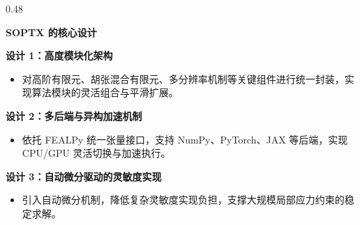 \documentclass[notheorems]{beamer}
\begin{document}
\begin{frame}
\begin{columns}[t, totalwidth=\linewidth]
			\hfill
			
			\begin{column}{0.48\linewidth}
				\begin{tcolorbox}[
					colback=structure.fg, colframe=structure.fg,
					coltext=white, boxrule=0pt, arc=2pt,
					top=3pt, bottom=3pt, left=6pt, right=6pt,
					]
					\centering\bfseries SOPTX 的核心设计
				\end{tcolorbox}
				
				\vspace{-0.2em}
				
				\begin{tcolorbox}[
					colback=panelbg, colframe=structure.fg!50,
					boxrule=0.5pt, arc=2pt,
					top=6pt, bottom=6pt, left=6pt, right=6pt,
					]
					{\fontsize{7.5}{11}\selectfont\sffamily
						\textbf{设计 1：高度模块化架构}
						\setlength{\itemsep}{2pt}
						\setlength{\parsep}{0pt}
						\setlength{\topsep}{4pt}
						\begin{itemize}
							\item 对高阶有限元、胡张混合有限元、多分辨率机制等关键组件进行统一封装，实现算法模块的灵活组合与平滑扩展。
						\end{itemize}
						
						\vspace{3pt}
						\textbf{设计 2：多后端与异构加速机制}
						\setlength{\itemsep}{2pt}
						\setlength{\parsep}{0pt}
						\setlength{\topsep}{4pt}
						\begin{itemize}
							\item 依托 FEALPy 统一张量接口，支持 NumPy、PyTorch、JAX 等后端，实现 CPU/GPU 灵活切换与加速执行。
						\end{itemize}
						
						\vspace{3pt}
						\textbf{设计 3：自动微分驱动的灵敏度实现}
						\setlength{\itemsep}{2pt}
						\setlength{\parsep}{0pt}
						\setlength{\topsep}{4pt}
						\begin{itemize}
							\item 引入自动微分机制，降低复杂灵敏度实现负担，支撑大规模局部应力约束的稳定求解。
						\end{itemize}
					}
				\end{tcolorbox}
			\end{column}
			
		\end{columns}
		
	\end{frame}
	
\end{document}

